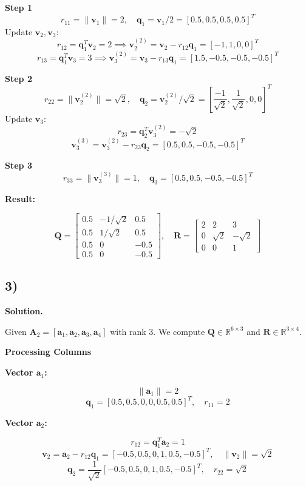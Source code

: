 \documentclass{article}
\newcommand{\0}{{\mathbf{0}}} %
\begin{document}
\textbf{Step 1}
\[ r_{11} = \|\mathbf{v}_1\| = 2, \quad \mathbf{q}_1 = \mathbf{v}_1 / 2 = [0.5, 0.5, 0.5, 0.5]^T \]
Update $\mathbf{v}_2, \mathbf{v}_3$:
\[ r_{12} = \mathbf{q}_1^T \mathbf{v}_2 = 2 \implies \mathbf{v}_2^{(2)} = \mathbf{v}_2 - r_{12}\mathbf{q}_1 = [-1, 1, 0, 0]^T \]
\[ r_{13} = \mathbf{q}_1^T \mathbf{v}_3 = 3 \implies \mathbf{v}_3^{(2)} = \mathbf{v}_3 - r_{13}\mathbf{q}_1 = [1.5, -0.5, -0.5, -0.5]^T \]

\textbf{Step 2}
\[ r_{22} = \|\mathbf{v}_2^{(2)}\| = \sqrt{2}, \quad \mathbf{q}_2 = \mathbf{v}_2^{(2)} / \sqrt{2} = [\frac{-1}{\sqrt{2}}, \frac{1}{\sqrt{2}}, 0, 0]^T \]
Update $\mathbf{v}_3$:
\[ r_{23} = \mathbf{q}_2^T \mathbf{v}_3^{(2)} = -\sqrt{2} \]
\[ \mathbf{v}_3^{(3)} = \mathbf{v}_3^{(2)} - r_{23}\mathbf{q}_2 = [0.5, 0.5, -0.5, -0.5]^T \]

\textbf{Step 3}
\[ r_{33} = \|\mathbf{v}_3^{(3)}\| = 1, \quad \mathbf{q}_3 = [0.5, 0.5, -0.5, -0.5]^T \]

\textbf{Result:}

\[
\mathbf{Q} =
\begin{bmatrix} 0.5 & -1/\sqrt{2} & 0.5 \\ 0.5 & 1/\sqrt{2} & 0.5 \\ 0.5 & 0 & -0.5 \\ 0.5 & 0 & -0.5
\end{bmatrix}, \quad
\mathbf{R} =
\begin{bmatrix} 2 & 2 & 3 \\ 0 & \sqrt{2} & -\sqrt{2} \\ 0 & 0 & 1
\end{bmatrix}
\]

\subsection*{3)}
\textbf{Solution.}

Given $\mathbf{A}_2 = [\mathbf{a}_1, \mathbf{a}_2, \mathbf{a}_3, \mathbf{a}_4]$ with rank 3. We compute $\mathbf{Q} \in \mathbb{R}^{6 \times 3}$ and $\mathbf{R} \in \mathbb{R}^{3 \times 4}$.

\textbf{Processing Columns}

\textbf{Vector $\mathbf{a}_1$:}

\[\|\mathbf{a}_1\| = 2\]
\[ \mathbf{q}_1 = [0.5, 0.5, 0, 0, 0.5, 0.5]^T, \quad r_{11}=2 \]

\textbf{Vector $\mathbf{a}_2$:}

\[r_{12} = \mathbf{q}_1^T \mathbf{a}_2 = 1\]
\[ \mathbf{v}_2 = \mathbf{a}_2 - r_{12} \mathbf{q}_1 = [-0.5, 0.5, 0, 1, 0.5, -0.5]^T, \quad \|\mathbf{v}_2\|=\sqrt{2} \]
\[ \mathbf{q}_2 = \frac{1}{\sqrt{2}}[-0.5, 0.5, 0, 1, 0.5, -0.5]^T, \quad r_{22}=\sqrt{2} \]
\end{document}
